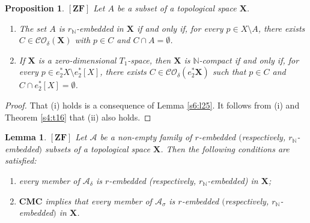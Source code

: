 \documentclass[12pt,twoside,leqno]{article}
\theoremstyle{plain}
\newtheorem{lemma}[theorem]{Lemma}
\newtheorem{proposition}[theorem]{Proposition}
\theoremstyle{definition}
\theoremstyle{remark}
\begin{document}
\begin{proposition}
	\label{s7:p6}
	$[\mathbf{ZF}]$ Let $A$ be a subset of a topological space $\mathbf{X}$.
	\begin{enumerate}
		\item[(i)] The set $A$ is $r_{\mathbb{N}}$-embedded in $\mathbf{X}$ if and only if, for every $p\in X\setminus A$,  there exists $C\in \mathcal{CO}_{\delta}(\mathbf{X})$ with $p\in C$ and $C\cap A=\emptyset$.
		
		\item[(ii)] If $\mathbf{X}$ is a zero-dimensional $T_1$-space, then $\mathbf{X}$ is $\mathbb{N}$-compact if and only if, for every $p\in e^{\ast}_{2}X\setminus e^{\ast}_{2}[X]$, there exists $C\in\mathcal{CO}_{\delta}(e^{\ast}_{2}\mathbf{X})$ such that $p\in C$ and $C\cap e^{\ast}_{2}[X]=\emptyset$.
	\end{enumerate}
\end{proposition}
\begin{proof}
	That (i) holds is a consequence of Lemma \ref{s6:l25}. It follows from (i) and Theorem \ref{s4:t16} that (ii) also holds.
\end{proof}

\begin{lemma}
	\label{s7:l7}
	$[\mathbf{ZF}]$ Let $\mathcal{A}$ be a non-empty family of $r$-embedded $($respectively, $r_{\mathbb{N}}$-embedded$)$ subsets of a topological space $\mathbf{X}$. Then the following conditions are satisfied:
	\begin{enumerate}
		\item[(i)]  every member of $\mathcal{A}_{\delta}$ is $r$-embedded (respectively, $r_{\mathbb{N}}$-embedded) in $\mathbf{X}$;
		\item[(ii)] $\mathbf{CMC}$ implies that every member of $\mathcal{A}_{\sigma}$ is $r$-embedded $($respectively, $r_{\mathbb{N}}$-embedded$)$ in $\mathbf{X}$.
	\end{enumerate}
\end{lemma}
\end{document}
